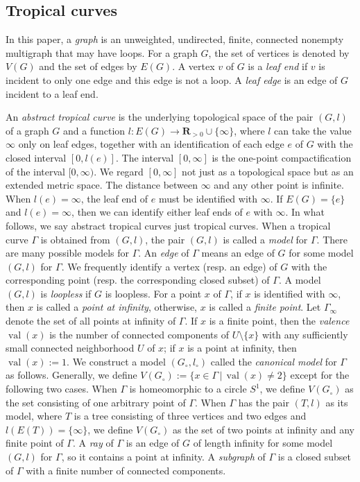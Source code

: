 \documentclass[a4paper,12pt]{amsart}
\def\Gamma{\varGamma}
\begin{document}
\subsection{Tropical curves}
    \label{subsection2.4}

In this paper, a \textit{graph} is an unweighted, undirected, finite, connected nonempty multigraph that may have loops.
For a graph $G$, the set of vertices is denoted by $V(G)$ and the set of edges by $E(G)$.
A vertex $v$ of $G$ is a \textit{leaf end} if $v$ is incident to only one edge and this edge is not a loop.
A \textit{leaf edge} is an edge of $G$ incident to a leaf end.

An \textit{abstract tropical curve} is the underlying topological space of the pair $(G, l)$ of a graph $G$ and a function $l: E(G) \to {\boldsymbol{R}}_{>0} \cup \{\infty\}$, where $l$ can take the value $\infty$ only on leaf edges, together with an identification of each edge $e$ of $G$ with the closed interval $[0, l(e)]$.
The interval $[0, \infty]$ is the one-point compactification of the interval $[0, \infty)$.
We regard $[0, \infty]$ not just as a topological space but as an extended metric space.
The distance between $\infty$ and any other point is infinite.
When $l(e)=\infty$, the leaf end of $e$ must be identified with $\infty$.
If $E(G) = \{ e \}$ and $l(e)=\infty$, then we can identify either leaf ends of $e$ with $\infty$.
In what follows, we say abstract tropical curves just tropical curves.
When a tropical curve $\Gamma$ is obtained from $(G, l)$, the pair $(G, l)$ is called a \textit{model} for $\Gamma$.
There are many possible models for $\Gamma$.
An \textit{edge} of $\Gamma$ means an edge of $G$ for some model $(G, l)$ for $\Gamma$.
We frequently identify a vertex (resp. an edge) of $G$ with the corresponding point (resp. the corresponding closed subset) of $\Gamma$.
A model $(G, l)$ is \textit{loopless} if $G$ is loopless.
For a point $x$ of $\Gamma$, if $x$ is identified with $\infty$, then $x$ is called a \textit{point at infinity}, otherwise, $x$ is called a \textit{finite point}.
Let $\Gamma_{\infty}$ denote the set of all points at infinity of $\Gamma$.
If $x$ is a finite point, then the \textit{valence} $\operatorname{val}(x)$ is the number of connected components of $U \setminus \{ x \}$ with any sufficiently small connected neighborhood $U$ of $x$; if $x$ is a point at infinity, then $\operatorname{val}(x) := 1$.
We construct a model $(G_{\circ}, l_{\circ})$ called the {\it canonical model} for $\Gamma$ as follows.
Generally, we define $V(G_{\circ}) := \{ x \in \Gamma \,|\, \operatorname{val}(x) \not= 2 \}$ except for the following two cases.
When $\Gamma$ is homeomorphic to a circle $S^1$, we define $V(G_{\circ})$ as the set consisting of one arbitrary point of $\Gamma$.
When $\Gamma$ has the pair $(T, l)$ as its model, where $T$ is a tree consisting of three vertices and two edges and $l(E(T)) = \{ \infty \}$, we define $V(G_{\circ})$ as the set of two points at infinity and any finite point of $\Gamma$.
A \textit{ray} of $\Gamma$ is an edge of $G$ of length infinity for some model $(G, l)$ for $\Gamma$, so it contains a point at infinity.
A \textit{subgraph} of $\Gamma$ is a closed subset of $\Gamma$ with a finite number of connected components.
\end{document}
